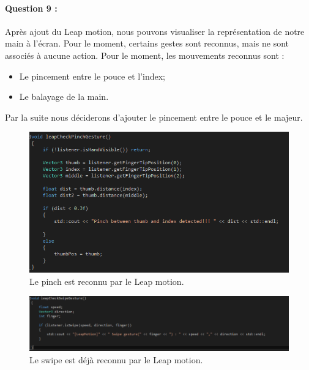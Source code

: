 \documentclass[a4paper,12pt]{article}
\begin{document}
\paragraph{Question 9 :} Après ajout du Leap motion, nous pouvons visualiser la représentation de notre main à l'écran. Pour le moment, certains gestes sont reconnus, mais ne sont associés à aucune action. Pour le moment, les mouvements reconnus sont :
\begin{itemize}
  \item Le pincement entre le pouce et l'index;
  \item Le balayage de la main.
\end{itemize}

Par la suite nous déciderons d'ajouter le pincement entre le pouce et le majeur.
\begin{figure}
  \centering
  \includegraphics{images/gestes_base.png}
  \caption{Le pinch est reconnu par le Leap motion.}
  \label{fig:}
\end{figure}
\begin{figure}
  \centering
  \includegraphics{images/gestes_base2.png}
  \caption{Le swipe est déjà reconnu par le Leap motion.}
  \label{fig:}
\end{figure}
\end{document}
